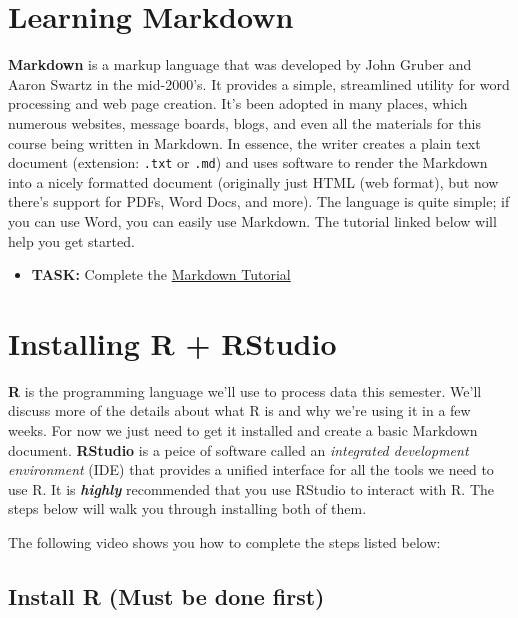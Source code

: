 \documentclass[]{tufte-book}
\providecommand{\tightlist}{%
  \setlength{\itemsep}{0pt}\setlength{\parskip}{0pt}}
\begin{document}
\hypertarget{learning-markdown}{%
\section{Learning Markdown}\label{learning-markdown}}

\textbf{Markdown} is a markup language that was developed by John Gruber and Aaron Swartz in the mid-2000's. It provides a simple, streamlined utility for word processing and web page creation. It's been adopted in many places, which numerous websites, message boards, blogs, and even all the materials for this course being written in Markdown. In essence, the writer creates a plain text document (extension: \texttt{.txt} or \texttt{.md}) and uses software to render the Markdown into a nicely formatted document (originally just HTML (web format), but now there's support for PDFs, Word Docs, and more). The language is quite simple; if you can use Word, you can easily use Markdown. The tutorial linked below will help you get started.

\begin{itemize}
\tightlist
\item
  \textbf{TASK:} Complete the \href{https://www.markdowntutorial.com/}{Markdown Tutorial}
\end{itemize}

\hypertarget{install-r}{%
\section{Installing R + RStudio}\label{install-r}}

\textbf{R} is the programming language we'll use to process data this semester. We'll discuss more of the details about what R is and why we're using it in a few weeks. For now we just need to get it installed and create a basic Markdown document. \textbf{RStudio} is a peice of software called an \emph{integrated development environment} (IDE) that provides a unified interface for all the tools we need to use R. It is \textbf{\emph{highly}} recommended that you use RStudio to interact with R. The steps below will walk you through installing both of them.

The following video shows you how to complete the steps listed below:

\hypertarget{install-r-must-be-done-first}{%
\subsection{Install R (Must be done first)}\label{install-r-must-be-done-first}}
\end{document}

